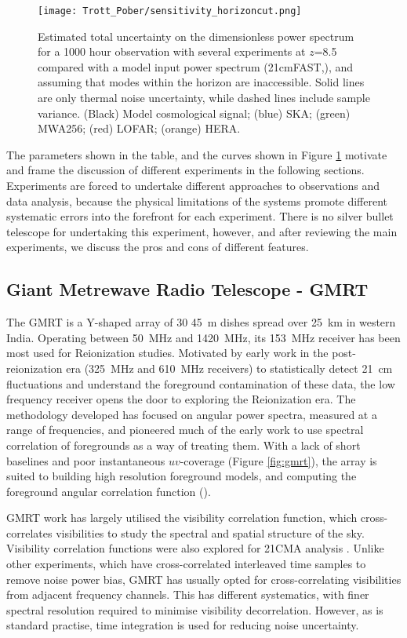 \begin{figure}[ht]
\centering
\texttt{[image: Trott\_Pober/sensitivity\_horizoncut.png]}
\caption{Estimated total uncertainty on the dimensionless power spectrum for a 1000 hour observation with several experiments at $z$=8.5 compared with a model input power spectrum (21cmFAST,\cite{mesinger11}), and assuming that modes within the horizon are inaccessible. Solid lines are only thermal noise uncertainty, while dashed lines include sample variance. (Black) Model cosmological signal; (blue) SKA; (green) MWA256; (red) LOFAR; (orange) HERA.}\label{fig:current}
\end{figure}
The parameters shown in the table, and the curves shown in Figure \ref{fig:current} motivate and frame the discussion of different experiments in the following sections. Experiments are forced to undertake different approaches to observations and data analysis, because the physical limitations of the systems promote different systematic errors into the forefront for each experiment. There is no silver bullet telescope for undertaking this experiment, however, and after reviewing the main experiments, we discuss the pros and cons of different features.

\subsection{Giant Metrewave Radio Telescope - GMRT}
\label{sec:gmrt}
The GMRT \cite{swarup91} is a Y-shaped array of 30 45~m dishes spread over 25~km in western India. Operating between 50~MHz and 1420~MHz, its 153~MHz receiver has been most used for Reionization studies. Motivated by early work in the post-reionization era (325~MHz and 610~MHz receivers) to statistically detect 21~cm fluctuations and understand the foreground contamination of these data, the low frequency receiver opens the door to exploring the Reionization era. The methodology developed has focused on angular power spectra, measured at a range of frequencies, and pioneered much of the early work to use spectral correlation of foregrounds as a way of treating them. With a lack of short baselines and poor instantaneous $uv$-coverage (Figure \ref{fig:gmrt}), the array is suited to building high resolution foreground models, and computing the foreground angular correlation function (\cite{rana19}).

GMRT work has largely utilised the visibility correlation function, which cross-correlates visibilities to study the spectral and spatial structure of the sky. Visibility correlation functions were also explored for 21CMA analysis \cite{zheng12}. Unlike other experiments, which have cross-correlated interleaved time samples to remove noise power bias, GMRT has usually opted for cross-correlating visibilities from adjacent frequency channels. This has different systematics, with finer spectral resolution required to minimise visibility decorrelation.  However, as is standard practise, time integration is used for reducing noise uncertainty.

